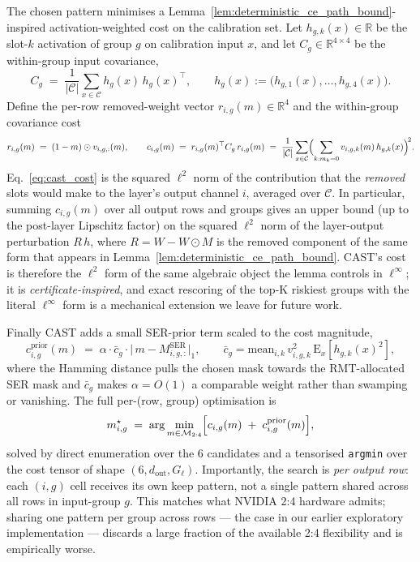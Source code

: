 \documentclass[11pt]{article}
\theoremstyle{plain}
\theoremstyle{definition}
\theoremstyle{remark}
\newcommand{\1}{\mathbf{1}}
\begin{document}
The chosen pattern minimises a Lemma~\ref{lem:deterministic_ce_path_bound}-inspired activation-weighted cost on the calibration set.  Let \(h_{g,k}(x)\in\mathbb R\) be the slot-\(k\) activation of group \(g\) on calibration input \(x\), and let \(C_g\in\mathbb R^{4\times 4}\) be the within-group input covariance,
\begin{equation}
\label{eq:cast_covariance}
C_g \;=\; \frac{1}{|\mathcal C|}\sum_{x\in\mathcal C} h_g(x)\,h_g(x)^\top,
\qquad
h_g(x):=\bigl(h_{g,1}(x),\ldots,h_{g,4}(x)\bigr).
\end{equation}
Define the per-row removed-weight vector \(r_{i,g}(m)\in\mathbb R^4\) and the within-group covariance cost
\begin{equation}
\label{eq:cast_cost}
r_{i,g}(m) \;=\; (1-m)\odot v_{i,g,:}(m),
\qquad
c_{i,g}(m) \;=\; r_{i,g}(m)^\top C_g\, r_{i,g}(m)
\;=\;
\frac{1}{|\mathcal C|}\sum_{x\in\mathcal C}\Bigl(\sum_{k:m_k=0} v_{i,g,k}(m)\,h_{g,k}(x)\Bigr)^{\!2}.
\end{equation}
Eq.~\eqref{eq:cast_cost} is the squared \(\ell^2\) norm of the contribution that the \emph{removed} slots would make to the layer's output channel \(i\), averaged over \(\mathcal C\).  In particular, summing \(c_{i,g}(m)\) over all output rows and groups gives an upper bound (up to the post-layer Lipschitz factor) on the squared \(\ell^2\) norm of the layer-output perturbation \(R\,h\), where \(R=W-W\odot M\) is the removed component of the same form that appears in Lemma~\ref{lem:deterministic_ce_path_bound}.  CAST's cost is therefore the \(\ell^2\) form of the same algebraic object the lemma controls in \(\ell^\infty\); it is \emph{certificate-inspired}, and exact rescoring of the top-K riskiest groups with the literal \(\ell^\infty\) form is a mechanical extension we leave for future work.

Finally CAST adds a small SER-prior term scaled to the cost magnitude,
\begin{equation}
\label{eq:cast_prior}
c^{\mathrm{prior}}_{i,g}(m) \;=\; \alpha\cdot \bar c_g \cdot \bigl|\,m - M^{\mathrm{SER}}_{i,g,:}\bigr|_1,
\qquad
\bar c_g = \mathrm{mean}_{i,k}\, v_{i,g,k}^2\,\mathrm E_x[h_{g,k}(x)^2],
\end{equation}
where the Hamming distance pulls the chosen mask towards the RMT-allocated SER mask and \(\bar c_g\) makes \(\alpha=O(1)\) a comparable weight rather than swamping or vanishing.  The full per-(row, group) optimisation is
\begin{equation}
\label{eq:cast_argmin}
m^\star_{i,g}\;=\;\arg\min_{m\in\mathcal M_{2:4}}\Bigl[c_{i,g}(m)\;+\;c^{\mathrm{prior}}_{i,g}(m)\Bigr],
\end{equation}
solved by direct enumeration over the 6 candidates and a tensorised \texttt{argmin} over the cost tensor of shape \((6,d_{\mathrm{out}},G_\ell)\).  Importantly, the search is \emph{per output row}: each \((i,g)\) cell receives its own keep pattern, not a single pattern shared across all rows in input-group \(g\).  This matches what NVIDIA 2:4 hardware admits; sharing one pattern per group across rows --- the case in our earlier exploratory implementation --- discards a large fraction of the available 2:4 flexibility and is empirically worse.
\end{document}
